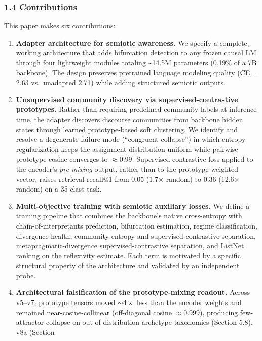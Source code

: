\documentclass[
  11pt]{article}
\begin{document}
\subsubsection{1.4 Contributions}\label{contributions}

This paper makes six contributions:

\begin{enumerate}
\def\labelenumi{\arabic{enumi}.}
\item
  \textbf{Adapter architecture for semiotic awareness.} We specify a
  complete, working architecture that adds bifurcation detection to any
  frozen causal LM through four lightweight modules totaling
  \textasciitilde14.5M parameters (0.19\% of a 7B backbone). The design
  preserves pretrained language modeling quality (CE = 2.63
  vs.~unadapted 2.71) while adding structured semiotic outputs.
\item
  \textbf{Unsupervised community discovery via supervised-contrastive
  prototypes.} Rather than requiring predefined community labels at
  inference time, the adapter discovers discourse communities from
  backbone hidden states through learned prototype-based soft
  clustering. We identify and resolve a degenerate failure mode
  (``congruent collapse'') in which entropy regularization keeps the
  assignment distribution uniform while pairwise prototype cosine
  converges to \(\approx 0.99\). Supervised-contrastive loss applied to
  the encoder's \emph{pre-mixing} output, rather than to the
  prototype-weighted vector, raises retrieval recall@1 from 0.05
  (1.7\(\times\) random) to 0.36 (12.6\(\times\) random) on a 35-class
  task.
\item
  \textbf{Multi-objective training with semiotic auxiliary losses.} We
  define a training pipeline that combines the backbone's native
  cross-entropy with chain-of-interpretants prediction, bifurcation
  estimation, regime classification, divergence health, community
  entropy and supervised-contrastive separation,
  metapragmatic-divergence supervised-contrastive separation, and
  ListNet ranking on the reflexivity estimate. Each term is motivated by
  a specific structural property of the architecture and validated by an
  independent probe.
\item
  \textbf{Architectural falsification of the prototype-mixing readout.}
  Across v5--v7, prototype tensors moved \(\sim 4\times\) less than the
  encoder weights and remained near-cosine-collinear (off-diagonal
  cosine \(\approx 0.999\)), producing few-attractor collapse on
  out-of-distribution archetype taxonomies (Section 5.8). v8a (Section

\end{enumerate}
\end{document}

